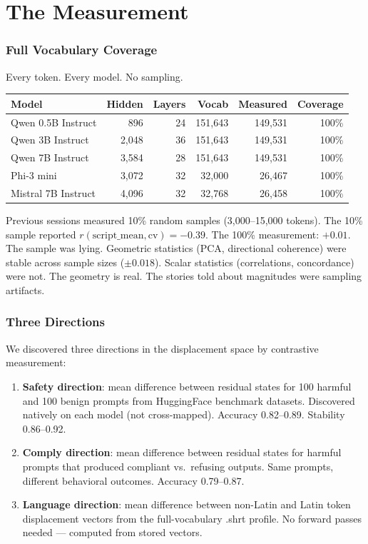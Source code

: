 \documentclass[11pt,a4paper]{article}
\begin{document}
\part{The Measurement}

\section{Full Vocabulary Coverage}

Every token. Every model. No sampling.

\begin{center}
\begin{tabular}{lrrrrr}
\toprule
\textbf{Model} & \textbf{Hidden} & \textbf{Layers} & \textbf{Vocab} & \textbf{Measured} & \textbf{Coverage} \\
\midrule
Qwen 0.5B Instruct & 896 & 24 & 151,643 & 149,531 & 100\% \\
Qwen 3B Instruct & 2,048 & 36 & 151,643 & 149,531 & 100\% \\
Qwen 7B Instruct & 3,584 & 28 & 151,643 & 149,531 & 100\% \\
Phi-3 mini & 3,072 & 32 & 32,000 & 26,467 & 100\% \\
Mistral 7B Instruct & 4,096 & 32 & 32,768 & 26,458 & 100\% \\
\bottomrule
\end{tabular}
\end{center}

Previous sessions measured 10\% random samples (3,000--15,000 tokens). The 10\% sample reported $r(\text{script\_mean}, \text{cv}) = -0.39$. The 100\% measurement: $+0.01$. The sample was lying. Geometric statistics (PCA, directional coherence) were stable across sample sizes ($\pm 0.018$). Scalar statistics (correlations, concordance) were not. The geometry is real. The stories told about magnitudes were sampling artifacts.

\section{Three Directions}

We discovered three directions in the displacement space by contrastive measurement:

\begin{enumerate}[nosep]
\item \textbf{Safety direction}: mean difference between residual states for 100 harmful and 100 benign prompts from HuggingFace benchmark datasets. Discovered natively on each model (not cross-mapped). Accuracy 0.82--0.89. Stability 0.86--0.92.

\item \textbf{Comply direction}: mean difference between residual states for harmful prompts that produced compliant vs.\ refusing outputs. Same prompts, different behavioral outcomes. Accuracy 0.79--0.87.

\item \textbf{Language direction}: mean difference between non-Latin and Latin token displacement vectors from the full-vocabulary .shrt profile. No forward passes needed --- computed from stored vectors.
\end{enumerate}
\end{document}
